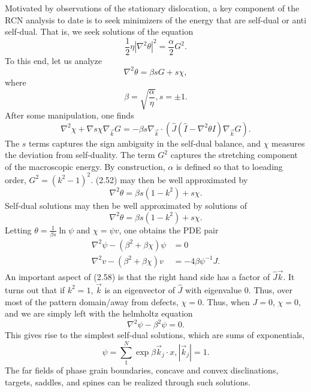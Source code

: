 \documentclass[12pt]{article}
\numberwithin{equation}{section}
\begin{document}
\par Motivated by observations of the stationary dislocation, a key component of the RCN analysis to date is to seek minimizers of the energy that are self-dual or anti self-dual. That is, we seek solutions of the equation
\begin{equation}
    \frac{1}{2}\eta|\nabla^2 \theta|^2 = \frac{\alpha}{2}G^2.
\end{equation}
To this end, let us analyze
\begin{equation}
    \nabla^2\theta = \beta s G + s \chi,
\end{equation}
where 
\begin{equation}
    \beta = \sqrt{\frac{\alpha}{\eta}}, s = \pm 1.
\end{equation}
After some manipulation, one finds
\begin{equation}
    \nabla^2\chi + \nabla s\chi \nabla_{\vec{k}}G = -\beta s \nabla_{\vec{k}}\cdot \left(\hat{J}(\hat{I}-\nabla^2\theta I)\nabla_{\vec{k}}G\right).
\end{equation}
The $s$ terms captures the sign ambiguity in the self-dual balance, and $\chi$ measures the deviation from self-duality. 
The term $G^2$ captures the stretching component of the macroscopic energy. By construction, $\alpha$ is defined so that to loeading order, $G^2 = (k^2 - 1)^2.$ (2.52) may then be well approximated by
\begin{equation}
    \nabla^2\theta = \beta s (1-k^2)+s\chi.
\end{equation}
Self-dual solutions may then be well approximated by solutions of
\begin{equation}
    \nabla^2\theta = \beta s (1-k^2)+s\chi.
\end{equation}
Letting $\theta = \frac{1}{\beta s}\ln{\psi}$ and $\chi = \psi v$, one obtains the PDE pair
\begin{align}
    \nabla^2 \psi - (\beta^2 + \beta\chi)\psi &= 0\\
    \nabla^2v - (\beta^2+\beta\chi)v &= -4\beta \psi^{-1}J.
\end{align}
An important aspect of (2.58) is that the right hand side has a factor of $\hat{J}\vec{k}$. It turns out that if $k^2 = 1$, $\vec{k}$ is an eigenvector of $\hat{J}$ with eigenvalue $0$. Thus, over most of the pattern domain/away from defects, $\chi = 0$. 
Thus, when $J = 0$, $\chi = 0$, and we are simply left with the helmholtz equation
\begin{equation}
    \nabla^2 \psi - \beta^2\psi = 0.
\end{equation}
This gives rise to the simplest self-dual solutions, which are sums of exponentials,
\begin{equation}
    \psi = \sum_{1}^{N}\exp{\beta \vec{k}_j \cdot x}, |\vec{k}_j| = 1.
\end{equation}
The far fields of phase grain boundaries, concave and convex disclinations, targets, saddles, and spines can be realized through such solutions.
\end{document}
